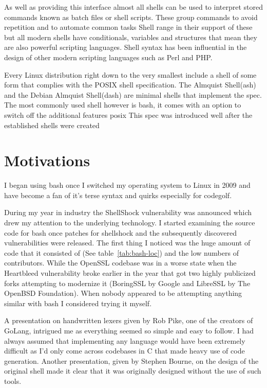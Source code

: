 As well as providing this interface almost all shells can be used to interpret stored commands known as batch files or shell scripts.
These group commands to avoid repetition and to automate common tasks
Shell range in their support of these but all modern shells have conditionals, variables and structures that mean they are also powerful scripting languages.
Shell syntax has been influential in the design of other modern scripting languages such as Perl and PHP.

Every Linux distribution right down to the very smallest\cite{ALPINE-LINUX} include a shell of some form that complies with the POSIX shell specification\cite{POSIX-SHELL-STANDARD}. The Almquist Shell(ash) and the Debian Almquist Shell(dash) are minimal shells that implement the spec.
The most commonly used shell however is bash, it comes with an option to switch off the additional features  posix
This spec was introduced well after the established shells were created 


\section{Motivations}
I began using bash once I switched my operating system to Linux in 2009 and have become a fan of it's terse syntax and quirks especially for codegolf\cite{CODE-GOLF}. %

During my year in industry the ShellShock\cite{SHELLSHOCK-CVE,SHELLSHOCK-LWN,SHELLSHOCK-SYMANTEC} vulnerability was announced which drew my attention to the underlying technology.
I started examining the source code for bash once patches for shellshock and the subsequently discovered vulnerabilities were released.
The first thing I noticed was the huge amount of code that it consisted of (See table~\ref{tab:bash-loc}) and the low numbers of contributors.
While the OpenSSL codebase was in a worse state when the Heartbleed vulnerability broke earlier in the year that got two highly publicized forks attempting to modernize it (BoringSSL by Google\cite{BORINGSSL} and LibreSSL by The OpenBSD Foundation\cite{LIBRESSL}).
When nobody appeared to be attempting anything similar with bash I considered trying it myself.

A presentation on handwritten lexers\cite{PIKE-LEXING-VIDEO} given by Rob Pike, one of the creators of GoLang, intrigued me as everything seemed so simple and easy to follow. 
I had always assumed that implementing any language would have been extremely difficult as I'd only come across codebases in C that made heavy use of code generation.
Another presentation, given by Stephen Bourne, on the design of the original shell\cite{DESIGN-OF-SH-VIDEO} made it clear that it was originally designed without the use of such tools.

